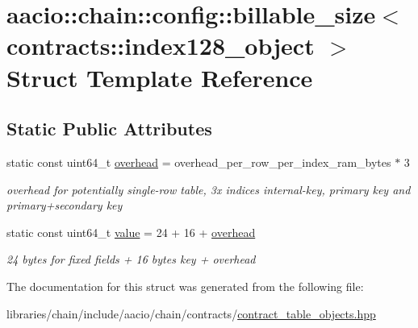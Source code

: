 \hypertarget{structaacio_1_1chain_1_1config_1_1billable__size_3_01contracts_1_1index128__object_01_4}{}\section{aacio\+:\+:chain\+:\+:config\+:\+:billable\+\_\+size$<$ contracts\+:\+:index128\+\_\+object $>$ Struct Template Reference}
\label{structaacio_1_1chain_1_1config_1_1billable__size_3_01contracts_1_1index128__object_01_4}
\subsection*{Static Public Attributes}
\begin{DoxyCompactItemize}
\item 
\mbox{\label{structaacio_1_1chain_1_1config_1_1billable__size_3_01contracts_1_1index128__object_01_4_aefa46555f78ae28e930f29e28f1d8fdb}} 
static const uint64\+\_\+t \mbox{\hyperlink{structaacio_1_1chain_1_1config_1_1billable__size_3_01contracts_1_1index128__object_01_4_aefa46555f78ae28e930f29e28f1d8fdb}{overhead}} = overhead\+\_\+per\+\_\+row\+\_\+per\+\_\+index\+\_\+ram\+\_\+bytes $\ast$ 3
\begin{DoxyCompactList}\small\item\em overhead for potentially single-\/row table, 3x indices internal-\/key, primary key and primary+secondary key \end{DoxyCompactList}\item 
\mbox{\label{structaacio_1_1chain_1_1config_1_1billable__size_3_01contracts_1_1index128__object_01_4_a3763b964a9043c066d98b8fb0652e03f}} 
static const uint64\+\_\+t \mbox{\hyperlink{structaacio_1_1chain_1_1config_1_1billable__size_3_01contracts_1_1index128__object_01_4_a3763b964a9043c066d98b8fb0652e03f}{value}} = 24 + 16 + \mbox{\hyperlink{structaacio_1_1chain_1_1config_1_1billable__size_3_01contracts_1_1index128__object_01_4_aefa46555f78ae28e930f29e28f1d8fdb}{overhead}}
\begin{DoxyCompactList}\small\item\em 24 bytes for fixed fields + 16 bytes key + overhead \end{DoxyCompactList}\end{DoxyCompactItemize}


The documentation for this struct was generated from the following file\+:\begin{DoxyCompactItemize}
\item 
libraries/chain/include/aacio/chain/contracts/\mbox{\hyperlink{contract__table__objects_8hpp}{contract\+\_\+table\+\_\+objects.\+hpp}}\end{DoxyCompactItemize}
